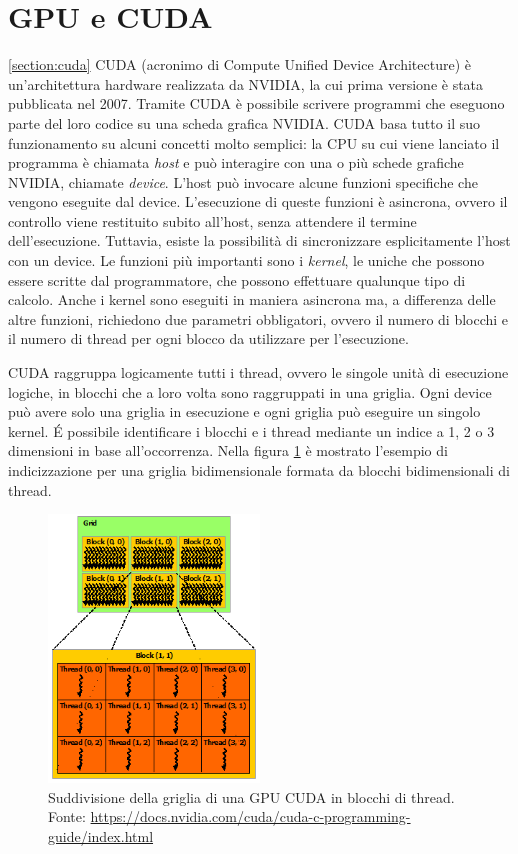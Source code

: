\documentclass[12pt,a4paper,oneside]{book}
\begin{document}
	\section{GPU e CUDA}
	\ref{section:cuda}
	CUDA (acronimo di Compute Unified Device Architecture) è un'architettura hardware realizzata da NVIDIA, la cui prima versione è stata pubblicata nel 2007. Tramite CUDA è possibile scrivere programmi che eseguono parte del loro codice su una scheda grafica NVIDIA. CUDA basa tutto il suo funzionamento su alcuni concetti molto semplici: la CPU su cui viene lanciato il programma è chiamata \textit{host} e può interagire con una o più schede grafiche NVIDIA, chiamate \textit{device}. L'host può invocare alcune funzioni specifiche che vengono eseguite dal device. L'esecuzione di queste funzioni è asincrona, ovvero il controllo viene restituito subito all'host, senza attendere il termine dell'esecuzione. Tuttavia, esiste la possibilità di sincronizzare esplicitamente l'host con un device. Le funzioni più importanti sono i \textit{kernel}, le uniche che possono essere scritte dal programmatore, che possono effettuare qualunque tipo di calcolo. Anche i kernel sono eseguiti in maniera asincrona ma, a differenza delle altre funzioni, richiedono due parametri obbligatori, ovvero il numero di blocchi e il numero di thread per ogni blocco da utilizzare per l'esecuzione.
	
	CUDA raggruppa logicamente tutti i thread, ovvero le singole unità di esecuzione logiche, in blocchi che a loro volta sono raggruppati in una griglia. Ogni device può avere solo una griglia in esecuzione e ogni griglia può eseguire un singolo kernel. \'E possibile identificare i blocchi e i thread mediante un indice a 1, 2 o 3 dimensioni in base all'occorrenza. Nella figura \ref{fig:grid-of-thread-blocks} è mostrato l'esempio di indicizzazione per una griglia bidimensionale formata da blocchi bidimensionali di thread.
	
	\begin{figure}[!ht]
		\centering
		\includegraphics[width=0.5\textwidth]{grid-of-thread-blocks}
		\caption[Struttura della griglia di una GPU CUDA]{Suddivisione della griglia di una GPU CUDA in blocchi di thread. Fonte: \url{https://docs.nvidia.com/cuda/cuda-c-programming-guide/index.html}}
		\label{fig:grid-of-thread-blocks}
	\end{figure}
	
\end{document}
